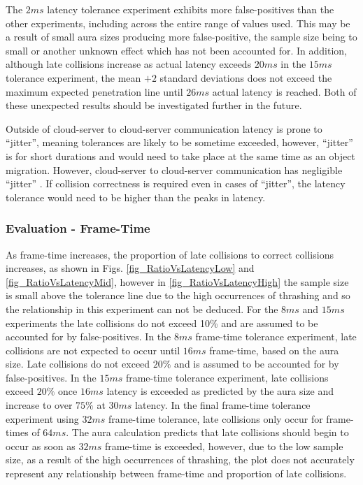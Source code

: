 The $2ms$ latency tolerance experiment exhibits more false-positives than the other experiments, including across the entire range of values used. This may be a result of small aura sizes producing more false-positive, the sample size being to small or another unknown effect which has not been accounted for. In addition, although late collisions increase as actual latency exceeds $20ms$ in the $15ms$ tolerance experiment, the mean $+2$ standard deviations does not exceed the maximum expected penetration line until $26ms$ actual latency is reached. Both of these unexpected results should be investigated further in the future.

Outside of cloud-server to cloud-server communication latency is prone to ``jitter'', meaning tolerances are likely to be sometime exceeded, however, ``jitter'' is for short durations and would need to take place at the same time as an object migration. However, cloud-server to cloud-server communication has negligible ``jitter'' \cite{ThousandEyesCloudPerf2018}. If collision correctness is required even in cases of ``jitter'', the latency tolerance would need to be higher than the peaks in latency. 

\subsubsection{Evaluation - Frame-Time}
As frame-time increases, the proportion of late collisions to correct collisions increases, as shown in Figs. \ref{fig_RatioVsLatencyLow} and \ref{fig_RatioVsLatencyMid}, however in \ref{fig_RatioVsLatencyHigh} the sample size is small above the tolerance line due to the high occurrences of thrashing and so the relationship in this experiment can not be deduced. For the $8ms$ and $15ms$ experiments the late collisions do not exceed 10\% and are assumed to be accounted for by false-positives. In the $8ms$ frame-time tolerance experiment, late collisions are not expected to occur until $16ms$ frame-time, based on the aura size. Late collisions do not exceed $20\%$ and is assumed to be accounted for by false-positives. In the $15ms$ frame-time tolerance experiment, late collisions exceed $20\%$ once $16ms$ latency is exceeded as predicted by the aura size and increase to over $75\%$ at $30ms$ latency.
In the final frame-time tolerance experiment using $32ms$ frame-time tolerance, late collisions only occur for frame-times of $64ms$. The aura calculation predicts that late collisions should begin to occur as soon as $32ms$ frame-time is exceeded, however, due to the low sample size, as a result of the high occurrences of thrashing, the plot does not accurately represent any relationship between frame-time and proportion of late collisions.

